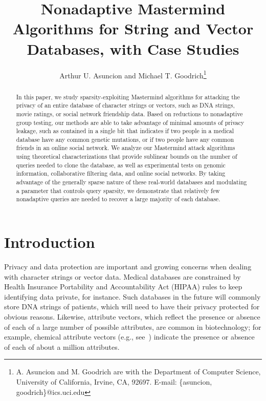 \documentclass{article}
\begin{document}
\title{Nonadaptive Mastermind Algorithms for String and Vector Databases, with Case Studies}

\author{Arthur U. Asuncion and Michael T. Goodrich\footnote{A. Asuncion and M. Goodrich are with the Department
of Computer Science, University of California, Irvine, CA, 92697.
E-mail: \{asuncion, goodrich\}@ics.uci.edu}}


\maketitle

\begin{abstract}
In this paper, we study sparsity-exploiting Mastermind algorithms for attacking 
the privacy of an entire database of character strings or vectors, such 
as DNA strings, movie ratings, or social network friendship data.  Based on reductions to 
nonadaptive group testing, our methods are able to take advantage of minimal 
amounts of privacy leakage, such as contained in a single bit that indicates if 
two people in a medical database have any common genetic mutations, or if two 
people have any common friends in an online social network.  We analyze our 
Mastermind attack algorithms using theoretical characterizations that provide
sublinear bounds on the number of queries needed to clone the database, as well as 
experimental tests on genomic information, collaborative filtering data, 
and online social networks.  By taking advantage of the generally sparse nature 
of these real-world databases and modulating a parameter that controls query sparsity, 
we demonstrate that relatively few nonadaptive queries are needed to recover a 
large majority of each database.
\end{abstract}


\section{Introduction}
Privacy and data protection are important and growing concerns 
when dealing with character strings or vector data. Medical databases are 
constrained by Health Insurance Portability and Accountability Act (HIPAA) rules 
to keep identifying data private, for instance. 
Such databases in the future will commonly store DNA strings of patients,
which will need to have their privacy protected for obvious reasons.
Likewise, attribute vectors, which reflect the presence or absence of
each of a large number of possible attributes, are common in biotechnology; 
for example, chemical attribute vectors (e.g., see~\cite{baldicompression07,swamidasssearch07})
indicate the presence or absence of each of about a million attributes.
\end{document}

